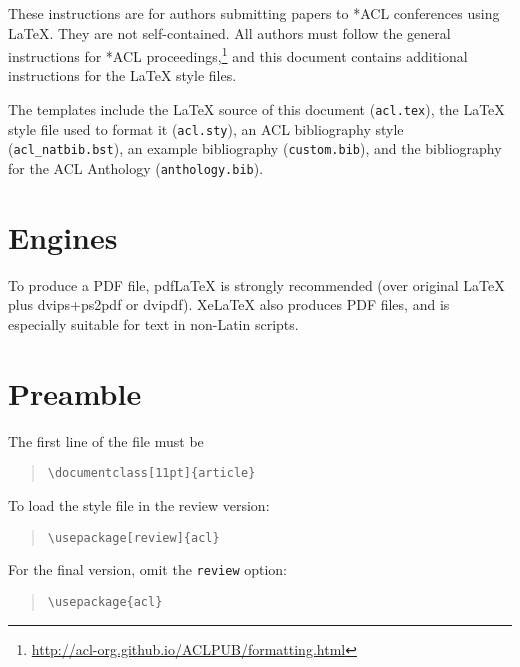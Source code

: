\documentclass[11pt]{article}
\begin{document}




\vfill
\pagebreak

These instructions are for authors submitting papers to *ACL conferences using \LaTeX. They are not self-contained. All authors must follow the general instructions for *ACL proceedings,\footnote{\url{http://acl-org.github.io/ACLPUB/formatting.html}} and this document contains additional instructions for the \LaTeX{} style files.

The templates include the \LaTeX{} source of this document (\texttt{acl.tex}),
the \LaTeX{} style file used to format it (\texttt{acl.sty}),
an ACL bibliography style (\texttt{acl\_natbib.bst}),
an example bibliography (\texttt{custom.bib}),
and the bibliography for the ACL Anthology (\texttt{anthology.bib}).

\section{Engines}

To produce a PDF file, pdf\LaTeX{} is strongly recommended (over original \LaTeX{} plus dvips+ps2pdf or dvipdf). Xe\LaTeX{} also produces PDF files, and is especially suitable for text in non-Latin scripts.

\section{Preamble}

The first line of the file must be
\begin{quote}
\begin{verbatim}
\documentclass[11pt]{article}
\end{verbatim}
\end{quote}

To load the style file in the review version:
\begin{quote}
\begin{verbatim}
\usepackage[review]{acl}
\end{verbatim}
\end{quote}
For the final version, omit the \verb|review| option:
\begin{quote}
\begin{verbatim}
\usepackage{acl}
\end{verbatim}
\end{quote}
\end{document}
